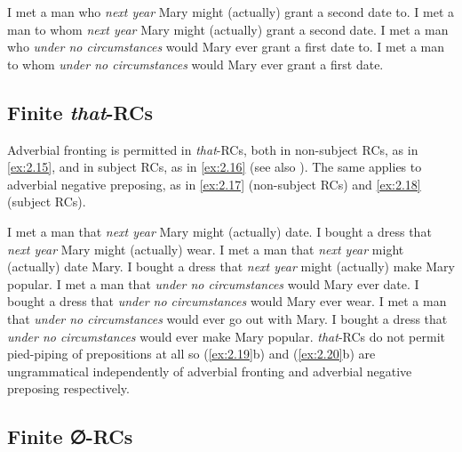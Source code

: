 \documentclass[output=paper]{langsci/langscibook}
\begin{document}
\ea\label{ex:2.13}
    \ea    I met a man who \textit{next year} Mary might (actually) grant a second date to.
    \ex    I met a man to whom \textit{next year} Mary might (actually) grant a second date.
    \z
\ex\label{ex:2.14}
    \ea    I met a man who \textit{under no circumstances} would Mary ever grant a first date   to.
    \ex    I met a man to whom \textit{under no circumstances} would Mary ever grant a first   date.
    \z
\z
\subsection{Finite \emph{that}-RCs}

Adverbial fronting is permitted in \emph{that}-RCs, both in non-subject RCs,
as in \eqref{ex:2.15}, and in subject RCs, as in \eqref{ex:2.16} (see also
\citealt{Doherty1993,Doherty2000}). The
same applies to adverbial negative preposing, as in \eqref{ex:2.17} (non-subject RCs) and
\eqref{ex:2.18} (subject RCs).

\ea\label{ex:2.15}
    \ea    I met a man that \textit{next year} Mary might (actually) date.
    \ex    I bought a dress that \textit{next year} Mary might (actually) wear.
    \z
\ex\label{ex:2.16}
    \ea    I met a man that \textit{next year} might (actually) date Mary.
    \ex    I bought a dress that \textit{next year} might (actually) make Mary popular.
    \z
\ex\label{ex:2.17}
    \ea    I met a man that \textit{under no circumstances} would Mary ever date.
    \ex    I bought a dress that \textit{under no circumstances} would Mary ever wear.
    \z
\ex\label{ex:2.18}
    \ea    I met a man that \textit{under no circumstances} would ever go out with Mary.
    \ex    I bought a dress that \textit{under no circumstances} would ever make Mary popular.
    \z
\z
\emph{that}-\glspl{RC} do not permit pied-piping of prepositions at all so (\ref{ex:2.19}b) and
(\ref{ex:2.20}b) are ungrammatical independently of adverbial fronting and adverbial
negative preposing respectively.

\ea\label{ex:2.19}
    \z
\ex\label{ex:2.20}
    \z
\z

\subsection{Finite ∅-RCs}
\end{document}
